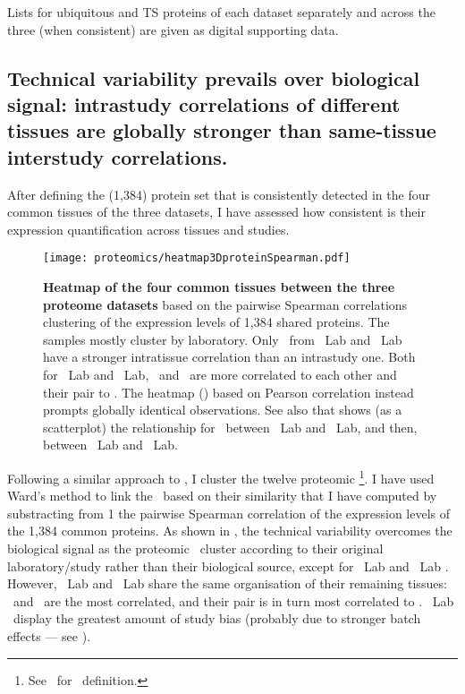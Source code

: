 Lists for ubiquitous and \gls{TS} proteins of each dataset separately
and across the three (when consistent) are given as digital supporting data.\mybr\

\vspace{-3mm}

\subsection{Technical variability prevails over biological signal:
intrastudy correlations of different tissues are globally stronger than
same-tissue interstudy correlations.}\label{subsec:protTechVarHigh}


After defining the (1,384) protein set that is consistently detected
in the four common tissues of the three datasets,
I have assessed how consistent is
their expression quantification across tissues and studies.\mybr\

\begin{figure}[!htbp]
    \texttt{[image: proteomics/heatmap3DproteinSpearman.pdf]}\centering
    \caption[Heatmap of the four common tissues between the three proteome
    datasets]{\label{fig:prot3Dheatmap}\textbf{Heatmap of the four common tissues
    between the three proteome datasets} based on
    the pairwise Spearman correlations clustering of the expression levels
    of 1,384 shared proteins.
    The samples mostly cluster by laboratory.
    Only \heart\ from \cutler\ Lab and \pandey\ Lab have a stronger intratissue correlation
    than an intrastudy one.
    Both for \pandey\ Lab and \cutler\ Lab,
    \pancreas\ and \lung\ are more correlated to each other and their pair to \ovary.
    The heatmap ()
    based on Pearson correlation instead prompts globally identical observations.
    See also  that shows (as a scatterplot)
    the relationship for \Heart\ between \pandey\ Lab and \cutler\ Lab, and then,
     between
    \pandey\ Lab and \kuster\ Lab.
    }
\end{figure}

Following a similar approach to ,
I cluster the twelve proteomic \treps\footnote{See~ for \treps\ definition.}.
I have used Ward's method to link the \treps\ based on their similarity that
I have computed by substracting from 1 the pairwise Spearman correlation
of the expression levels of the 1,384 common proteins.
As shown in ,
the technical variability overcomes the biological signal
as the proteomic \treps\ cluster according to their original laboratory/study
rather than their biological source,
except for \cutler\ Lab and \pandey\ Lab \heart.
However,
\cutler\ Lab and \pandey\ Lab share the same organisation of their remaining tissues:
\pancreas\ and \lung\ are the most correlated,
and their pair is in turn most correlated to \ovary.
\kuster\ Lab \treps\ display the greatest amount of study bias
(probably due to stronger batch effects --- see ).\mybr\

